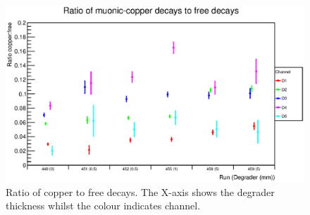 \begin{figure}[hptb]
  \centering
    \includegraphics[width=.9\textwidth]{images/plot_generating_scripts/Ratio.eps}
  \caption{Ratio of copper to free decays. The X-axis shows the degrader thickness whilst the colour indicates channel.}
  \label{fig:images_plot_generating_scripts_Ratio}
\end{figure}

